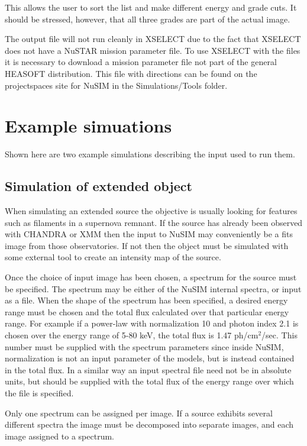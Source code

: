 \documentclass[11pt]{article}
\begin{document}
This allows the user to sort the list and make different energy and grade cuts. It should be stressed, however, that all three grades are part of the actual image.

The output file will not run cleanly in XSELECT due to the fact that XSELECT does not have a NuSTAR mission parameter file. To use XSELECT with the files it is necessary to download a mission parameter file not part of the general HEASOFT distribution. This file with directions can be found on the projectspaces site for NuSIM in the Simulations/Tools folder.

\section{Example simuations}
Shown here are two example simulations describing the input used to run them.

\subsection{Simulation of extended object}
When simulating an extended source the objective is usually looking for features such as filaments in a supernova remnant. If the source has already been observed with CHANDRA or XMM then the input to NuSIM may conveniently be a fits image from those observatories. If not then the object must be simulated with some external tool to create an intensity map of the source.

Once the choice of input image has been chosen, a spectrum for the source must be specified. The spectrum may be either of the NuSIM internal spectra, or input as a file. When the shape of the spectrum has been specified, a desired energy range must be chosen and the total flux calculated over that particular energy range. For example if a power-law with normalization 10 and photon index 2.1 is chosen over the energy range of 5-80 keV, the total flux is 1.47 ph/cm$^2$/sec. This number must be supplied with the spectrum parameters since inside NuSIM, normalization is not an input parameter of the models, but is instead contained in the total flux. In a similar way an input spectral file need not be in absolute units, but should be supplied with the total flux of the energy range over which the file is specified.

Only one spectrum can be assigned per image. If a source exhibits several different spectra the image must be decomposed into separate images, and each image assigned to a spectrum.
\end{document}
